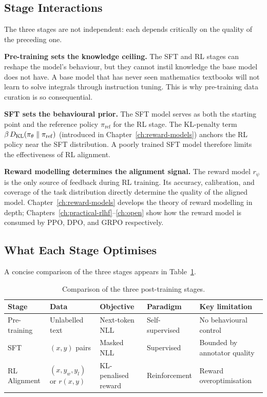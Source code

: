\subsection{Stage Interactions}

The three stages are not independent: each depends critically on the quality of the preceding one.

\textbf{Pre-training sets the knowledge ceiling.} The SFT and RL stages can reshape the model's behaviour, but they cannot instil knowledge the base model does not have. A base model that has never seen mathematics textbooks will not learn to solve integrals through instruction tuning. This is why pre-training data curation is so consequential.

\textbf{SFT sets the behavioural prior.} The SFT model serves as both the starting point and the reference policy $\pi_{\mathrm{ref}}$ for the RL stage. The KL-penalty term $\beta\,D_{\mathrm{KL}}\!\left(\pi_\theta\;\|\;\pi_{\mathrm{ref}}\right)$ (introduced in Chapter~\ref{ch:reward-models}) anchors the RL policy near the SFT distribution. A poorly trained SFT model therefore limits the effectiveness of RL alignment.

\textbf{Reward modelling determines the alignment signal.} The reward model $r_\psi$ is the only source of feedback during RL training. Its accuracy, calibration, and coverage of the task distribution directly determine the quality of the aligned model. Chapter~\ref{ch:reward-models} develops the theory of reward modelling in depth; Chapters~\ref{ch:practical-rlhf}--\ref{ch:open} show how the reward model is consumed by PPO, DPO, and GRPO respectively.

\subsection{What Each Stage Optimises}

A concise comparison of the three stages appears in Table~\ref{tab:pipeline-comparison}.

\begin{table}[ht]
\centering
\caption{Comparison of the three post-training stages.}
\label{tab:pipeline-comparison}
\footnotesize
\begin{tabular}{@{}p{2.1cm}p{3cm}p{2.6cm}p{2.3cm}p{3.2cm}@{}}
\toprule
\textbf{Stage} & \textbf{Data} & \textbf{Objective} & \textbf{Paradigm} & \textbf{Key limitation} \\
\midrule
Pre-training & Unlabelled text & Next-token NLL & Self-supervised & No behavioural control \\
SFT & $(x, y)$ pairs & Masked NLL & Supervised & Bounded by annotator quality \\
RL Alignment & $(x, y_w, y_l)$ or $r(x,y)$ & KL-penalised reward & Reinforcement & Reward overoptimisation \\
\bottomrule
\end{tabular}
\end{table}


